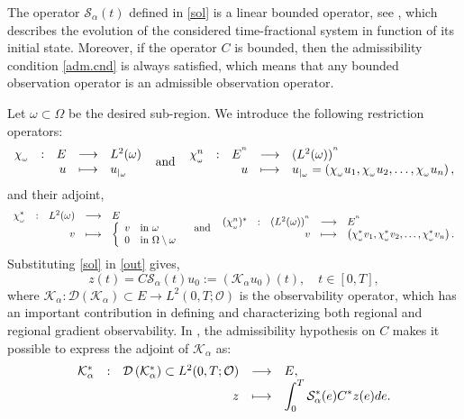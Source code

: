 \documentclass{article}
\begin{document}
The operator $\mathcal{S}_\alpha(t)$ defined in \eqref{sol}
is a linear bounded operator, see \cite{zguaid.2021}, which describes the evolution 
of the considered time-fractional system in function of its initial state. 
Moreover, if the operator $C$ is bounded, then the admissibility condition 
\eqref{adm.cnd} is always satisfied, which means that any bounded observation 
operator is an admissible observation operator.

Let $\omega\subset\Omega$ be the desired sub-region. 
We introduce the following restriction operators: 
$$
\begin{array}{lllll}
\chi_{_\omega} &:& E&\longrightarrow & L^2(\omega)\\
& & \hfill u & \longmapsto & u_{|_\omega}
\end{array} 
\ \mbox{ and } \ 
\begin{array}{lllll}
\chi_{_\omega}^{n} &:& E^{^n}&\longrightarrow & (L^2(\omega))^{^n}\\
& & \hfill  u& \longmapsto & u_{|_\omega} = \left(\chi_{_\omega}u_1,
\chi_{_\omega}u_2,\ldots,\chi_{_\omega}u_n\right),
\end{array} 
$$
and their adjoint,
$$
\begin{array}{lllll}
\chi_{_\omega}^* &:& L^2(\omega)&\longrightarrow & E\\
& & \hfill v & \longmapsto & 
\left\{
\begin{array}{ll}
v & \text{in} \ \omega\\
0& \text{in} \ \Omega\setminus\omega
\end{array}\right.
\end{array} 
\ \mbox{ and } \ 
\begin{array}{lllll}
(\chi_{_\omega}^{n})^* &:& (L^2(\omega))^{^n}&\longrightarrow & E^{^n}\\
& & \hfill  v& \longmapsto &  \left(\chi_{_\omega}^*v_1,
\chi_{_\omega}^*v_2,\ldots,\chi_{_\omega}^*v_n\right).
\end{array} 
$$
Substituting \eqref{sol} in \eqref{out} gives, 
$$
z(t) = C\mathcal{S}_\alpha(t)u_0
:=(\mathcal{K}_\alpha u_0)(t), \quad t\in[0,T],
$$
where $\mathcal{K}_\alpha : \mathcal{D}\left(\mathcal{K}_\alpha\right)
\subset E \longrightarrow L^2(0,T;\mathcal{O})$ is the observability 
operator, which has an important contribution in defining and characterizing 
both regional and regional gradient observability. 
In \cite{regional.analysis}, the admissibility hypothesis on $C$ 
makes it possible to express the adjoint of $\mathcal{K}_\alpha$ as:
\begin{equation}
\label{K_alp}
\begin{array}{lllll}
\mathcal{K}_\alpha^*&:& \mathcal{D}\left(\mathcal{K}_\alpha^*\right)
\subset L^2(0,T;\mathcal{O}) &\longrightarrow &E,\\
& &\hfill z& \longmapsto
& \displaystyle\int_{0}^{T}\mathcal{S}_\alpha^*(e)C^*z(e)de. 
\end{array}
\end{equation}
\end{document}
